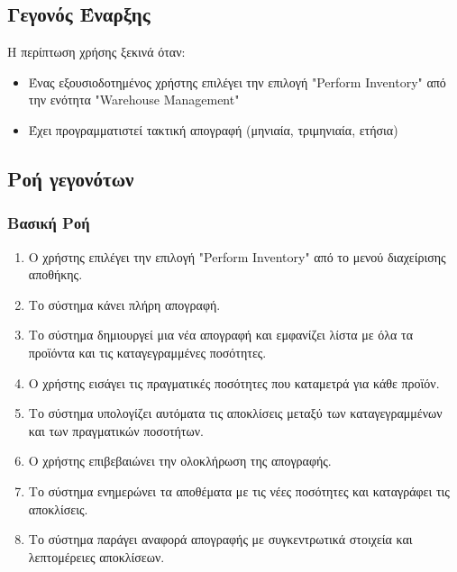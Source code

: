 \documentclass[12pt,a4paper,twoside]{book}
\begin{document}
\subsection{Γεγονός Έναρξης}
Η περίπτωση χρήσης ξεκινά όταν:
\begin{itemize}
  \item Ένας εξουσιοδοτημένος χρήστης επιλέγει την επιλογή "Perform Inventory" από την ενότητα "Warehouse Management" %
  \item Έχει προγραμματιστεί τακτική απογραφή (μηνιαία, τριμηνιαία, ετήσια)
\end{itemize}

\subsection{Ροή γεγονότων}

\subsubsection{Βασική Ροή}
\begin{enumerate}
  \item Ο χρήστης επιλέγει την επιλογή "Perform Inventory" από το μενού διαχείρισης αποθήκης. %
  \item Το σύστημα κάνει πλήρη απογραφή.
  \item Το σύστημα δημιουργεί μια νέα απογραφή και εμφανίζει λίστα με όλα τα προϊόντα και τις καταγεγραμμένες ποσότητες. %
  \item Ο χρήστης εισάγει τις πραγματικές ποσότητες που καταμετρά για κάθε προϊόν.
  \item Το σύστημα υπολογίζει αυτόματα τις αποκλίσεις μεταξύ των καταγεγραμμένων και των πραγματικών ποσοτήτων.
  \item Ο χρήστης επιβεβαιώνει την ολοκλήρωση της απογραφής.
  \item Το σύστημα ενημερώνει τα αποθέματα με τις νέες ποσότητες και καταγράφει τις αποκλίσεις.
  \item Το σύστημα παράγει αναφορά απογραφής με συγκεντρωτικά στοιχεία και λεπτομέρειες αποκλίσεων.
\end{enumerate}
\end{document}
